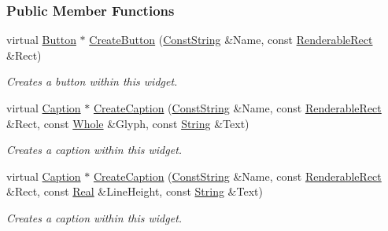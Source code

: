 \subsubsection*{Public Member Functions}
\begin{DoxyCompactItemize}
\item 
virtual \hyperlink{classMezzanine_1_1UI_1_1Button}{Button} $\ast$ \hyperlink{classMezzanine_1_1UI_1_1RenderableContainerWidget_ab4923b194c5eedf4fe24861cc19ee641}{CreateButton} (\hyperlink{namespaceMezzanine_a63cd699ac54b73953f35ec9cfc05e506}{ConstString} \&Name, const \hyperlink{structMezzanine_1_1UI_1_1RenderableRect}{RenderableRect} \&Rect)
\begin{DoxyCompactList}\small\item\em Creates a button within this widget. \item\end{DoxyCompactList}\item 
virtual \hyperlink{classMezzanine_1_1UI_1_1Caption}{Caption} $\ast$ \hyperlink{classMezzanine_1_1UI_1_1RenderableContainerWidget_a091ce1b3a1b9596c038bad6ce1cf0a91}{CreateCaption} (\hyperlink{namespaceMezzanine_a63cd699ac54b73953f35ec9cfc05e506}{ConstString} \&Name, const \hyperlink{structMezzanine_1_1UI_1_1RenderableRect}{RenderableRect} \&Rect, const \hyperlink{namespaceMezzanine_adcbb6ce6d1eb4379d109e51171e2e493}{Whole} \&Glyph, const \hyperlink{namespaceMezzanine_acf9fcc130e6ebf08e3d8491aebcf1c86}{String} \&Text)
\begin{DoxyCompactList}\small\item\em Creates a caption within this widget. \item\end{DoxyCompactList}\item 
virtual \hyperlink{classMezzanine_1_1UI_1_1Caption}{Caption} $\ast$ \hyperlink{classMezzanine_1_1UI_1_1RenderableContainerWidget_a073a30682c074b96d12975bc1fd9d1ea}{CreateCaption} (\hyperlink{namespaceMezzanine_a63cd699ac54b73953f35ec9cfc05e506}{ConstString} \&Name, const \hyperlink{structMezzanine_1_1UI_1_1RenderableRect}{RenderableRect} \&Rect, const \hyperlink{namespaceMezzanine_a726731b1a7df72bf3583e4a97282c6f6}{Real} \&LineHeight, const \hyperlink{namespaceMezzanine_acf9fcc130e6ebf08e3d8491aebcf1c86}{String} \&Text)
\begin{DoxyCompactList}\small\item\em Creates a caption within this widget. \item\end{DoxyCompactList}\item 

\end{DoxyCompactItemize}
